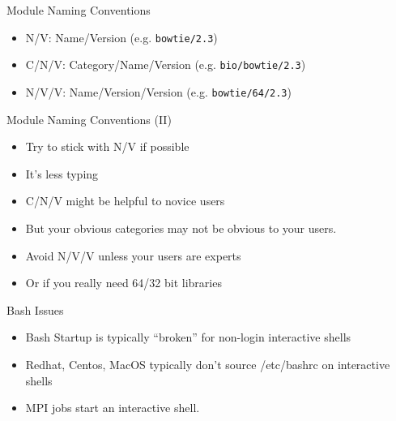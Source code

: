 \documentclass[dvipsnames,aspectratio=169]{beamer}
\begin{document}
%

\begin{frame}{Module Naming Conventions}
  \begin{itemize}
    \item N/V:   Name/Version (e.g. \texttt{bowtie/2.3})
    \item C/N/V: Category/Name/Version (e.g. \texttt{bio/bowtie/2.3})
    \item N/V/V: Name/Version/Version (e.g. \texttt{bowtie/64/2.3})
  \end{itemize}
\end{frame}

\begin{frame}{Module Naming Conventions (II)}
  \begin{itemize}
    \item Try to stick with N/V if possible
    \item It's less typing
    \item C/N/V might be helpful to novice users
    \item But your obvious categories may not be obvious to your users.
    \item Avoid N/V/V unless your users are experts 
    \item Or if you really need 64/32 bit libraries
  \end{itemize}
\end{frame}

\begin{frame}{Bash Issues}
  \begin{itemize}
    \item Bash Startup is typically ``broken'' for non-login
      interactive shells
    \item Redhat, Centos, MacOS typically don't source /etc/bashrc on
      interactive shells
    \item MPI jobs start an interactive shell.
  \end{itemize}
\end{frame}
\end{document}
